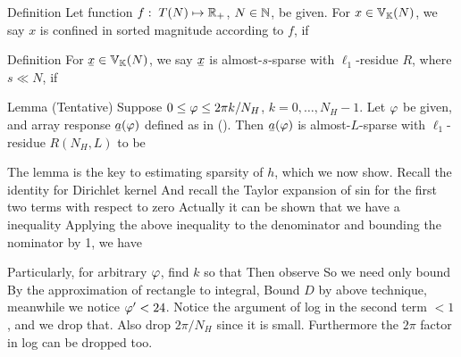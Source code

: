 \Result
{Definition}
{
Let function \(f:\; T (N) \mapsto \mathbb{R}_+\), \(N \in \mathbb{N}\), be given.
For \(x \in \mathbb{V}_{\mathbb{K}}(N)\), we say \(x\) is confined in sorted magnitude according to \(f\), if
}

\Result
{Definition}
{
For \(\V{x} \in \MB{V}_{\MB{K}}(N)\), we say \(\V{x}\) is almost-\(s\)-sparse with \(\ell_1\)-residue \(R\), where \(s \ll N\), if
}


\Result
{Lemma (Tentative)}
{
Suppose \(0 \leq \varphi \leq 2\pi k /N_H\), \(k =0, \dotsc, N_H-1\).
Let \(\varphi\) be given, and array response \(\V{a} (\f)\) defined as in ().
Then \(\V{a} (\f)\) is almost-\(L\)-sparse with \(\ell_1\)-residue \(R(N_H, L)\) to be
%
}

The lemma is the key to estimating sparsity of \(h\), which we now show.
Recall the identity for Dirichlet kernel
%
%
And recall the Taylor expansion of sin for the first two terms with respect to zero
%
%
Actually it can be shown that we have a inequality
%
%
Applying the above inequality to the denominator and bounding the nominator by 1, we have
%

Particularly, for arbitrary \(\varphi\), find \(k\) so that
%
Then observe
So we need only bound
By the approximation of rectangle to integral,
Bound \(D\) by above technique, meanwhile we notice \(\varphi' <24\).
Notice the argument of log in the second term \(<1\), and we drop that.
Also drop \(2\pi /N_H\) since it is small.
Furthermore the \(2\pi\) factor in log can be dropped too.

